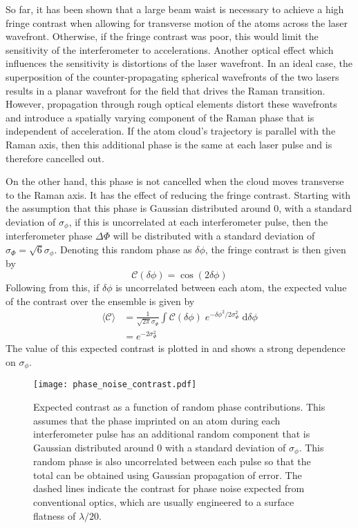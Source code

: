 So far, it has been shown that a large beam waist is necessary to achieve a high
fringe contrast when allowing for transverse motion of the atoms across the
laser wavefront. Otherwise, if the fringe contrast was poor, this would limit
the sensitivity of the interferometer to accelerations. Another optical effect which influences the
sensitivity is distortions of the laser wavefront. In an ideal case, the
superposition of the counter-propagating spherical wavefronts of the two lasers results in a planar
wavefront for the field that drives the Raman transition. However,
propagation through rough optical elements distort these wavefronts and
introduce a spatially varying component of the Raman phase that is independent
of acceleration. If the atom cloud's trajectory is parallel with the Raman axis,
then this additional phase is the same at each laser pulse and is therefore
cancelled out. 
\par\noindent
On the other hand, this phase is not cancelled when the cloud moves transverse to
the Raman axis. It has the effect of reducing the fringe
contrast. Starting with the assumption that this phase is Gaussian distributed
around 0, with a standard deviation of \(\sigma_\phi\), if this is uncorrelated
at each interferometer pulse, then the interferometer phase \(\Delta \Phi\) will
be distributed with a standard deviation of \(\sigma_\Phi = \sqrt{6}
\sigma_\phi\). Denoting this random phase as \(\delta\phi\), the fringe contrast
is then given by
\begin{equation}
	\mathcal{C}(\delta \phi) = \cos\left(2 \delta\phi\right)
\end{equation}
Following from this, if \( \delta \phi\) is uncorrelated between each atom, the
expected value of the contrast over the ensemble is given by
\begin{align}
	\langle \mathcal{C} \rangle & = \frac{1}{\sqrt{2\pi}\sigma_\Phi}\int \mathcal{C}(\delta \phi) \; e^{-\delta\phi^2/2\sigma_\Phi^2} \; \mathrm{d}\delta\phi \\
	                            & = e^{-2 \sigma_\Phi^2}
\end{align}
The value of this expected contrast is plotted in
 and shows a strong dependence on
\(\sigma_\phi\). 
\begin{figure}[!htbp]
	\centering
	\texttt{[image: phase\_noise\_contrast.pdf]}
  \caption[Expected fringe contrast as a function of random phase
  contributions.]{Expected contrast as a function of random phase contributions. This
		assumes that the phase imprinted on an atom during each interferometer pulse
		has an additional random component that is Gaussian distributed around 0
		with a standard deviation of \(\sigma_\phi\). This random phase is also
		uncorrelated between each pulse so that the total can be obtained using
		Gaussian propagation of error. The dashed lines indicate the contrast for
		phase noise expected from conventional optics, which are usually engineered
		to a surface flatness of \(\lambda/20\).}
	\label{fig:raman_phasenoise}
\end{figure}

